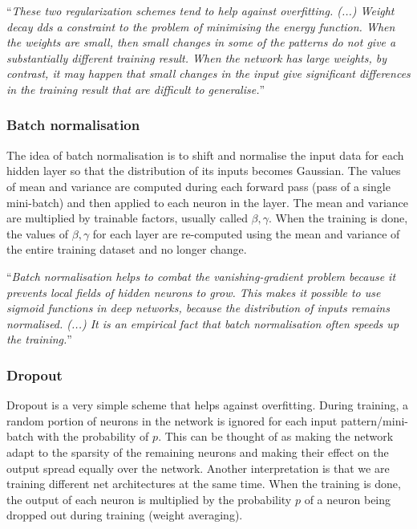 \enquote{\textit{These two regularization schemes tend to help against overfitting. (...) Weight decay dds a constraint to the problem of minimising the energy function. When the weights are small, then small changes in some of the patterns do not give a substantially different training result. When the network	has large weights, by contrast, it may happen that small changes in the input give	significant differences in the training result that are difficult to generalise.}} \cite{mehlig}

\subsubsection{Batch normalisation}

The idea of batch normalisation is to shift and normalise the input data for each
hidden layer so that the distribution of its inputs becomes Gaussian. The values of mean and variance are computed during each forward pass (pass of a single mini-batch) and then applied to each neuron in the layer. The mean and variance are multiplied by trainable factors, usually called $ \beta, \gamma $. \cite{stanford-L6} \cite{mehlig} When the training is done, the values of $ \beta, \gamma $ for each layer are re-computed using the mean and variance of the entire training dataset and no longer change. \cite{issue}

\enquote{\textit{Batch normalisation helps to combat the vanishing-gradient problem because it prevents local fields of hidden neurons to grow. This makes it possible to use sigmoid functions in deep networks, because the distribution of inputs remains normalised. (...) It is an empirical fact that batch normalisation often speeds up the training.}} \cite{mehlig}

\subsubsection{Dropout}
\label{dropout_sec}

Dropout is a very simple scheme that helps against overfitting. During training, a random portion of neurons in the network is ignored for each input pattern/mini-batch with the probability of $ p $. This can be thought of as making the network adapt to the sparsity of the remaining neurons and making their effect on the output spread equally over the network. Another interpretation is that we are training different net architectures at the same time. When the training is done, the output of each neuron is multiplied by the probability $ p $ of a neuron being dropped out during training (weight averaging). \cite{mehlig} \cite{stanford-L7}

